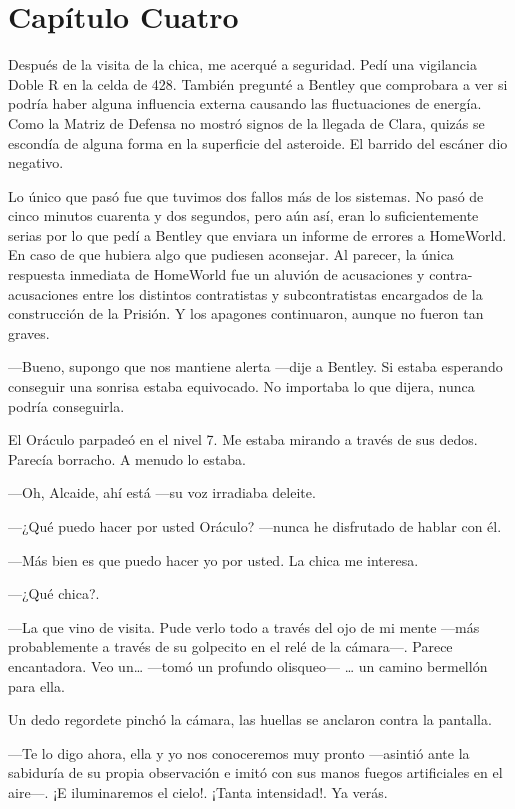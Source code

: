 \chapter*{Capítulo Cuatro}

Después de la visita de la chica, me acerqué a seguridad. Pedí una
vigilancia Doble R en la celda de 428. También pregunté a Bentley que
comprobara a ver si podría haber alguna influencia externa causando las
fluctuaciones de energía. Como la Matriz de Defensa no mostró signos de
la llegada de Clara, quizás se escondía de alguna forma en la superficie
del asteroide. El barrido del escáner dio negativo.

Lo único que pasó fue que tuvimos dos fallos más de los sistemas. No
pasó de cinco minutos cuarenta y dos segundos, pero aún así, eran lo
suficientemente serias por lo que pedí a Bentley que enviara un informe
de errores a HomeWorld. En caso de que hubiera algo que pudiesen
aconsejar. Al parecer, la única respuesta inmediata de HomeWorld fue un
aluvión de acusaciones y contra-acusaciones entre los distintos
contratistas y subcontratistas encargados de la construcción de la
Prisión. Y los apagones continuaron, aunque no fueron tan graves.

---Bueno, supongo que nos mantiene alerta ---dije a Bentley. Si estaba
esperando conseguir una sonrisa estaba equivocado. No importaba lo que
dijera, nunca podría conseguirla.

El Oráculo parpadeó en el nivel 7. Me estaba mirando a través de sus
dedos. Parecía borracho. A menudo lo estaba.

---Oh, Alcaide, ahí está ---su voz irradiaba deleite.

---¿Qué puedo hacer por usted Oráculo? ---nunca he disfrutado de hablar
con él.

---Más bien es que puedo hacer yo por usted. La chica me interesa.

---¿Qué chica?.

---La que vino de visita. Pude verlo todo a través del ojo de mi mente
---más probablemente a través de su golpecito en el relé de la
cámara---. Parece encantadora. Veo un\ldots{} ---tomó un profundo
olisqueo--- \ldots{} un camino bermellón para ella.

Un dedo regordete pinchó la cámara, las huellas se anclaron contra la
pantalla.

---Te lo digo ahora, ella y yo nos conoceremos muy pronto ---asintió
ante la sabiduría de su propia observación e imitó con sus manos fuegos
artificiales en el aire---. ¡E iluminaremos el cielo!. ¡Tanta
intensidad!. Ya verás.

